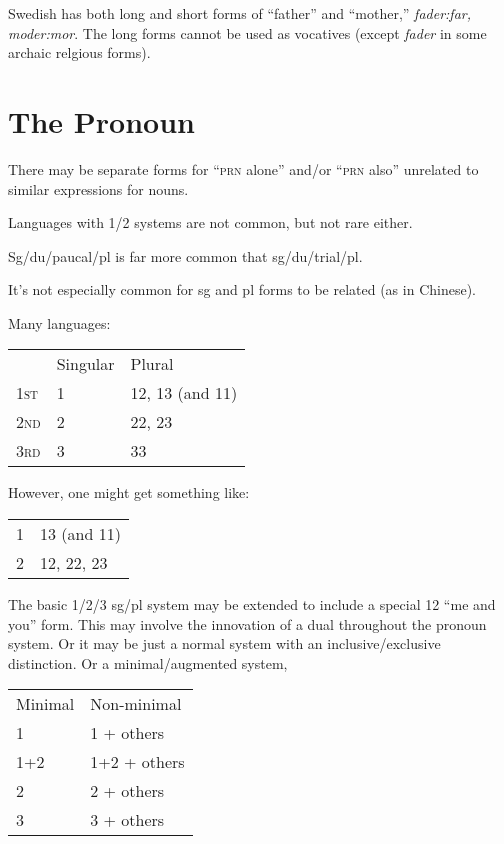 \documentclass[11pt]{article}
\newcommand{\I}[1]{\textsc{#1}}   %
\begin{document}
Swedish has both long and short forms of ``father'' and ``mother,''
\textit{fader:far, moder:mor}.  The long forms cannot be used as
vocatives (except \textit{fader} in some archaic relgious forms).


\section{The Pronoun}
There may be separate forms for ``\I{prn} alone'' and/or ``\I{prn}
also'' unrelated to similar expressions for nouns.

Languages with 1/2 systems are not common, but not rare either.

Sg/du/paucal/pl is far more common that sg/du/trial/pl.

It's not especially common for sg and pl forms to be related (as in
Chinese).

Many languages:

\begin{center}
\begin{tabular}{lll}
  & Singular & Plural \\
\I{1st} & 1 & 12, 13 (and 11) \\
\I{2nd} & 2 & 22, 23 \\
\I{3rd} & 3 & 33
\end{tabular}
\end{center}

However, one might get something like:

\begin{center}
\begin{tabular}{ll}
1 & 13 (and 11) \\
2 & 12, 22, 23     
\end{tabular}
\end{center}

The basic 1/2/3 sg/pl system may be extended to include a special 12
``me and you'' form.  This may involve the innovation of a dual
throughout the pronoun system.  Or it may be just a normal system with
an inclusive/exclusive distinction.  Or a minimal/augmented system, 

\begin{center}
\begin{tabular}{ll}
Minimal & Non-minimal \\
1  & 1 + others \\
1+2 & 1+2 + others \\
2 & 2 + others \\
3 & 3 + others 
\end{tabular}
\end{center}
\end{document}
